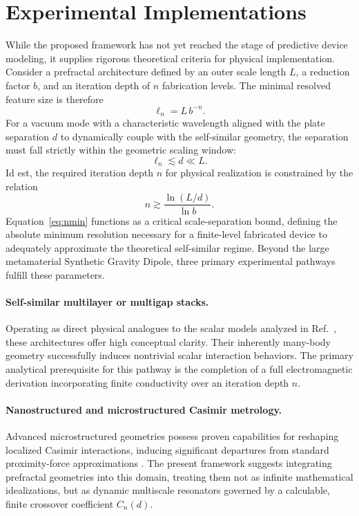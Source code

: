 \documentclass[12pt,letterpaper]{article}
\begin{document}
\section{Experimental Implementations}
\label{sec:experimental}

While the proposed framework has not yet reached the stage of predictive device modeling, it supplies rigorous theoretical criteria for physical implementation.
Consider a prefractal architecture defined by an outer scale length $L$, a reduction factor $b$, and an iteration depth of $n$ fabrication levels.
The minimal resolved feature size is therefore
\begin{equation}
\ell_n = L\,b^{-n}.
\label{eq:elln}
\end{equation}
For a vacuum mode with a characteristic wavelength aligned with the plate separation $d$ to dynamically couple with the self-similar geometry, the separation must fall strictly within the geometric scaling window:
\begin{equation}
\ell_n \lesssim d \ll L.
\label{eq:window}
\end{equation}
Id est, the required iteration depth $n$ for physical realization is constrained by the relation
\begin{equation}
n \gtrsim \frac{\ln(L/d)}{\ln b}.
\label{eq:nmin}
\end{equation}
Equation~\eqref{eq:nmin} functions as a critical scale-separation bound, defining the absolute minimum resolution necessary for a finite-level fabricated device to adequately approximate the theoretical self-similar regime.
Beyond the large metamaterial Synthetic Gravity Dipole, three primary experimental pathways fulfill these parameters.

\paragraph{Self-similar multilayer or multigap stacks.}
Operating as direct physical analogues to the scalar models analyzed in Ref.~\cite{shajesh2016}, these architectures offer high conceptual clarity.
Their inherently many-body geometry successfully induces nontrivial scalar interaction behaviors.
The primary analytical prerequisite for this pathway is the completion of a full electromagnetic derivation incorporating finite conductivity over an iteration depth $n$.

\paragraph{Nanostructured and microstructured Casimir metrology.}
Advanced microstructured geometries possess proven capabilities for reshaping localized Casimir interactions, inducing significant departures from standard proximity-force approximations \cite{rodriguez2011}.
The present framework suggests integrating prefractal geometries into this domain, treating them not as infinite mathematical idealizations, but as dynamic multiscale resonators governed by a calculable, finite crossover coefficient $C_n(d)$.
\end{document}
